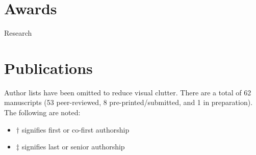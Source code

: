 \documentclass[10pt,a4paper,sans]{moderncv} %
\begin{document}
\section{Awards}

\vspace{5mm}

{\huge Research}

\section{Publications}

Author lists have been omitted to reduce visual clutter.
There are a total of 62 manuscripts (53 peer-reviewed, 8 pre-printed/submitted, and 1 in preparation).
The following are noted:

\begin{itemize}
\item $\dagger$ signifies first or co-first authorship
\item $\ddagger$ signifies last or senior authorship
\end{itemize}

\vspace{0.3cm}
\end{document}
